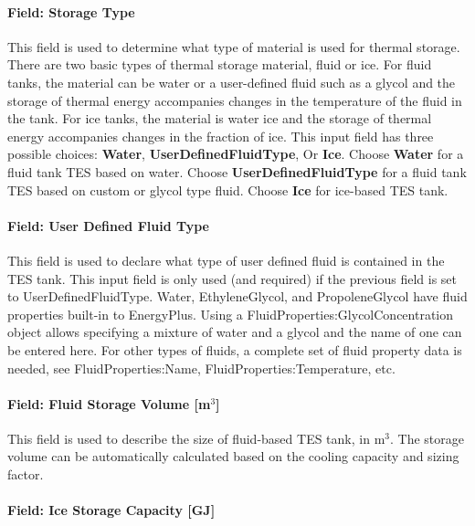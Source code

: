 \paragraph{Field: Storage Type}\label{field-storage-type}

This field is used to determine what type of material is used for thermal storage. There are two basic types of thermal storage material, fluid or ice. For fluid tanks, the material can be water or a user-defined fluid such as a glycol and the storage of thermal energy accompanies changes in the temperature of the fluid in the tank. For ice tanks, the material is water ice and the storage of thermal energy accompanies changes in the fraction of ice. This input field has three possible choices: \textbf{Water}, \textbf{UserDefinedFluidType}, Or \textbf{Ice}. Choose \textbf{Water} for a fluid tank TES based on water. Choose \textbf{UserDefinedFluidType} for a fluid tank TES based on custom or glycol type fluid. Choose \textbf{Ice} for ice-based TES tank.

\paragraph{Field: User Defined Fluid Type}\label{field-user-defined-fluid-type}

This field is used to declare what type of user defined fluid is contained in the TES tank. This input field is only used (and required) if the previous field is set to UserDefinedFluidType. Water, EthyleneGlycol, and PropoleneGlycol have fluid properties built-in to EnergyPlus. Using a FluidProperties:GlycolConcentration object allows specifying a mixture of water and a glycol and the name of one can be entered here. For other types of fluids, a complete set of fluid property data is needed, see FluidProperties:Name, FluidProperties:Temperature, etc.

\paragraph{\texorpdfstring{Field: Fluid Storage Volume {[}m\(^{3}\){]}}{Field: Fluid Storage Volume {[}m\^{}\{3\}{]}}}\label{field-fluid-storage-volume-m3}

This field is used to describe the size of fluid-based TES tank, in m\(^{3}\). The storage volume can be automatically calculated based on the cooling capacity and sizing factor.

\paragraph{Field: Ice Storage Capacity {[}GJ{]}}\label{field-ice-storage-capacity-gj}

